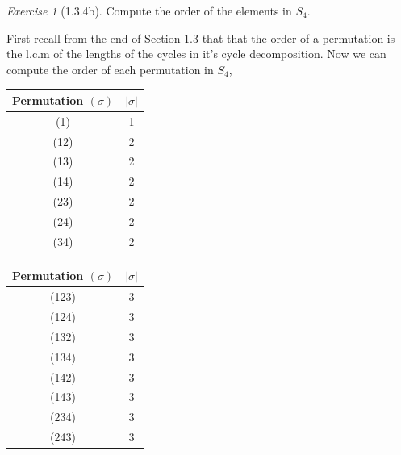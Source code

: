 \documentclass[12pt]{amsart}
\makeatletter
\theoremstyle{remark}
\newtheorem*{exercise}{Exercise}%
\renewenvironment{proof}[1][\proofname]{\par\doublespacing
  \pushQED{\qed}%
  \normalfont \topsep6\p@\@plus6\p@\relax
  \list{}{%
    \settowidth{\leftmargin}{\itshape\proofname:\hskip\labelsep}%
    \setlength{\labelwidth}{0pt}%
    \setlength{\itemindent}{-\leftmargin}%
  }%
  \item[\hskip\labelsep\itshape#1\@addpunct{:}]\ignorespaces
}{%
  \popQED\endlist\@endpefalse
  \singlespacing
}
\theoremstyle{mycomment}
\makeatother
\begin{document}
\begin{exercise}[1.3.4b] Compute the order of the elements in $S_4$.
    \begin{proof}[Solution:] First recall from the end of Section 1.3 
      that that the order of a permutation is the l.c.m of the lengths of the cycles in it's cycle decomposition. Now we can compute the order of each permutation in $S_4$,
      \begin{center}
      \begin{minipage}{.45\textwidth}
        \begin{tabular}{c | c } 
          Permutation $(\sigma)$ & $|\sigma|$ \\ 
          \hline
          (1) & 1\\
          (12) & 2\\
          (13) & 2\\
          (14) & 2\\
          (23) & 2\\
          (24) & 2\\
          (34) & 2
        \end{tabular}
      \end{minipage}
      \hfill
      \begin{minipage}{.45\textwidth}
        \begin{tabular}{c | c } 
          Permutation $(\sigma)$ & $|\sigma|$ \\ 
          \hline
          (123) & 3\\
          (124) & 3\\
          (132) & 3\\
          (134) & 3\\
          (142) & 3\\
          (143) & 3\\
          (234) & 3\\
          (243) & 3
        \end{tabular}
      \end{minipage}     
    \end{center}
  

\end{proof}
\end{exercise}
\end{document}
